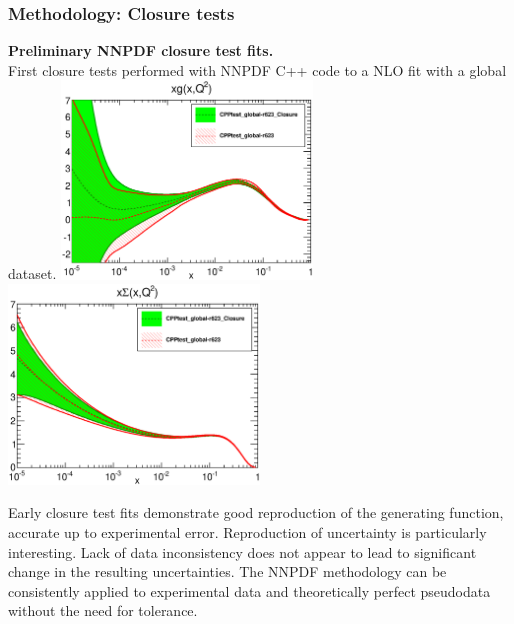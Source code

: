 \documentclass[10pt]{beamer}
\begin{document}
\begin{frame}
\frametitle{Methodology: Closure tests}


\small  {\textbf{Preliminary NNPDF closure test fits.} }\\
First closure tests performed with NNPDF C++ code to a NLO fit with a global dataset.
\vskip5pt
     \includegraphics[width=0.5\textwidth]{pdf_xg_log.eps}
     \includegraphics[width=0.5\textwidth]{pdf_xSigma_log.eps}

     \vskip5pt
\small{ Early closure test fits demonstrate good reproduction of the generating function, accurate up to experimental error. }
\vskip10pt
\small{Reproduction of uncertainty is particularly interesting. Lack of data inconsistency does not appear to lead to significant change in the resulting uncertainties. }
\vskip10pt
\small{The NNPDF methodology can be consistently applied to experimental data and theoretically perfect pseudodata without the need for tolerance.}

\end{frame}
\end{document}
